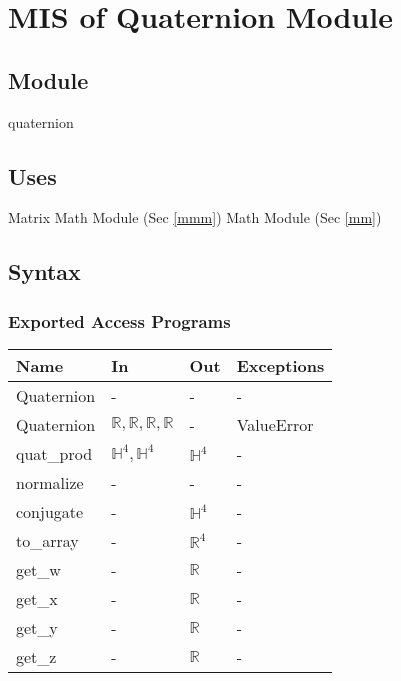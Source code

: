 \documentclass[12pt, titlepage]{article}
\begin{document}
\section{MIS of Quaternion Module} \label{qm}

\subsection{Module}
quaternion

\subsection{Uses}
Matrix Math Module (Sec \ref{mmm}) \newline
Math Module (Sec \ref{mm})

\subsection{Syntax}

\subsubsection{Exported Access Programs}

\begin{center}
\begin{tabular}{p{2.5cm} p{5.5cm} p{2cm} p{2cm}}
\hline
\textbf{Name} & \textbf{In} & \textbf{Out} & \textbf{Exceptions} \\
\hline
Quaternion & - & - & - \\
Quaternion & $\mathbb{R}, \mathbb{R}, \mathbb{R}, \mathbb{R}$ & - & ValueError \\
quat\_prod & $\mathbb{H}^4, \mathbb{H}^4$ & $\mathbb{H}^4$ & - \\
normalize & - & - & - \\
conjugate & - & $ \mathbb{H}^4$ & - \\
to\_array & - & $\mathbb{R}^4$ & - \\
get\_w & - & $\mathbb{R}$ & - \\
get\_x & - & $\mathbb{R}$ & - \\
get\_y & - & $\mathbb{R}$ & - \\
get\_z & - & $\mathbb{R}$ & - \\
\hline
\end{tabular}
\end{center}
\end{document}
